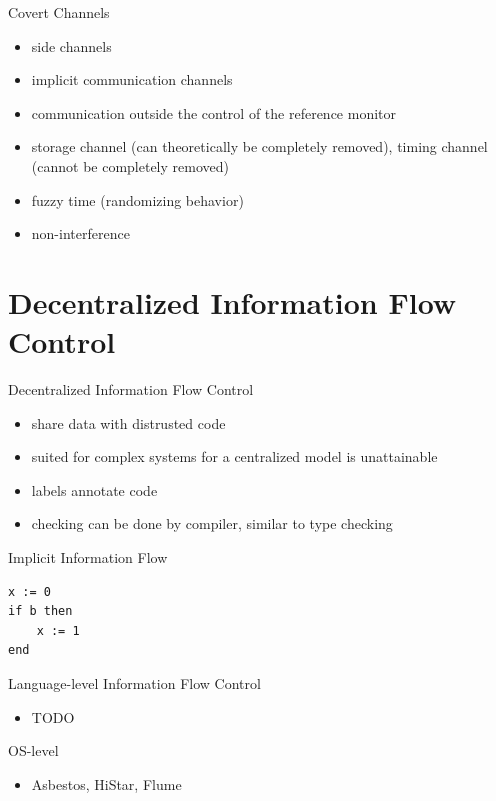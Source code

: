 \documentclass{curs}
\begin{document}
\begin{frame}{Covert Channels}
  \begin{itemize}
    \item side channels
    \item implicit communication channels
    \item communication outside the control of the reference monitor
    \item storage channel (can theoretically be completely removed), timing channel (cannot be completely removed)
    \item fuzzy time (randomizing behavior)
    \item non-interference
  \end{itemize}
\end{frame}

\section{Decentralized Information Flow Control}

\begin{frame}{Decentralized Information Flow Control}
  \begin{itemize}
    \item share data with distrusted code
    \item suited for complex systems for a centralized model is unattainable
    \item labels annotate code
    \item checking can be done by compiler, similar to type checking
  \end{itemize}
\end{frame}

\begin{frame}[fragile]{Implicit Information Flow}
  \begin{verbatim}
x := 0
if b then
    x := 1
end
  \end{verbatim}
\end{frame}

\begin{frame}{Language-level Information Flow Control}
  \begin{itemize}
    \item TODO
  \end{itemize}
\end{frame}

\begin{frame}{OS-level}
  \begin{itemize}
    \item Asbestos, HiStar, Flume
  \end{itemize}
\end{frame}
\end{document}
